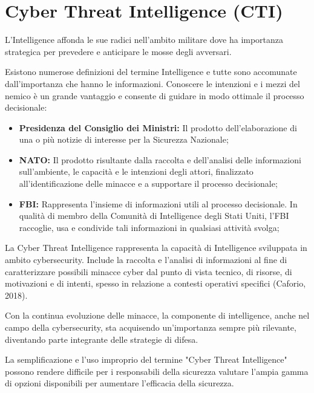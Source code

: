 \chapter{Cyber Threat Intelligence (CTI)}
\label{chap:Cyber Threat Intelligence}

L’Intelligence affonda le sue radici nell’ambito militare dove ha importanza strategica per prevedere e anticipare le mosse degli avversari.

Esistono numerose definizioni del termine Intelligence e tutte sono accomunate dall’importanza che hanno le informazioni. 
Conoscere le intenzioni e i mezzi del nemico è un grande vantaggio e consente di guidare in modo ottimale il processo decisionale:


\begin{itemize}
    \item\textbf{Presidenza del Consiglio dei Ministri:} Il prodotto dell’elaborazione di una o più notizie di interesse per la Sicurezza Nazionale;
    \item\textbf{NATO:} Il prodotto risultante dalla raccolta e dell’analisi delle informazioni sull’ambiente, le capacità e le intenzioni degli attori, finalizzato all’identificazione delle minacce e a supportare il processo decisionale;
    \item\textbf{FBI:} Rappresenta l’insieme di informazioni utili al processo decisionale. In qualità di membro della Comunità di Intelligence degli Stati Uniti, l’FBI raccoglie, usa e condivide tali informazioni in qualsiasi attività svolga;
\end{itemize}


La Cyber Threat Intelligence rappresenta la capacità di Intelligence sviluppata in ambito cybersecurity. Include la raccolta e l’analisi di informazioni al fine di caratterizzare possibili minacce cyber dal punto di vista tecnico, di risorse, di motivazioni e di intenti, spesso in relazione a contesti operativi specifici (Caforio, 2018).

Con la continua evoluzione delle minacce, la componente di intelligence, anche nel campo della cybersecurity, sta acquisendo un’importanza sempre più rilevante, diventando parte integrante delle strategie di difesa.

La semplificazione e l'uso improprio del termine "Cyber Threat Intelligence" possono rendere difficile per i responsabili della sicurezza valutare l'ampia gamma di opzioni disponibili per aumentare l'efficacia della sicurezza. 

\newpage

